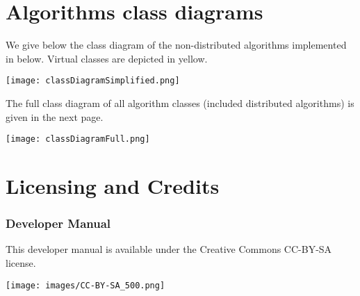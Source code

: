 


\chapter{Algorithms class diagrams}

We give below the class diagram of the non-distributed algorithms implemented in \imitator{} below.
Virtual classes are depicted in yellow.


\texttt{[image: classDiagramSimplified.png]}



The full class diagram of all algorithm classes (included distributed algorithms) is given in the next page.

\newenvironment{changemargin}[2]{%
\begin{list}{}{%
\setlength{\topsep}{0pt}%
\setlength{\leftmargin}{#1}%
\setlength{\rightmargin}{#2}%
\setlength{\listparindent}{\parindent}%
\setlength{\itemindent}{\parindent}%
\setlength{\parsep}{\parskip}%
}%
\item[]}{\end{list}}

\newpage
\begin{landscape}
\begin{changemargin}{-2.cm}{-3cm}
\thispagestyle{empty}
\texttt{[image: classDiagramFull.png]}
\end{changemargin}
\end{landscape}
\newpage


\chapter{Licensing and Credits}


\subsection*{Developer Manual}
This developer manual is available under the Creative Commons CC-BY-SA license.

\begin{center}
	\texttt{[image: images/CC-BY-SA\_500.png]}
\end{center}











